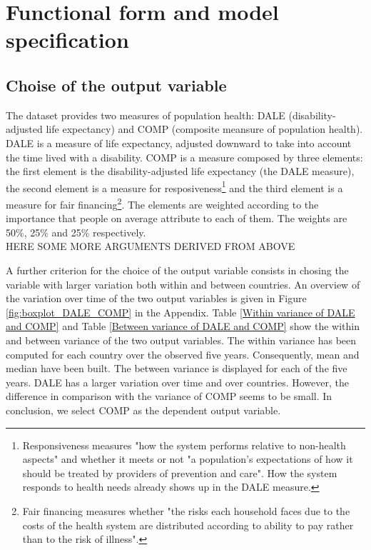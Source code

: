 \documentclass[12pt,a4paper]{article}\usepackage[]{graphicx}\usepackage[]{color}
\begin{document}
\section{Functional form and model specification}
\subsection{Choise of the output variable}
The dataset provides two measures of population health: DALE (disability-adjusted life expectancy) and COMP (composite meansure of population health). DALE is a measure of life expectancy, adjusted downward to take into account the time lived with a disability. COMP is a measure composed by three elements: the first element is the disability-adjusted life expectancy (the DALE measure), the second element is a measure for resposiveness\footnote{Responsiveness measures "how the system performs relative to non-health aspects" and whether it meets or not "a population's expectations of how it should be treated by providers of prevention and care". How the system responds to health needs already shows up in the DALE measure.} and the third element is a measure for fair financing\footnote{Fair financing measures whether "the risks each household faces due to the costs of the health system are distributed according to ability to pay rather than to the risk of illness".}. The elements are weighted according to the importance that people on average attribute to each of them. The weights are 50\%, 25\% and 25\% respectively. \\


HERE SOME MORE ARGUMENTS DERIVED FROM ABOVE


A further criterion for the choice of the output variable consists in chosing the variable with larger variation both within and between countries. An overview of the variation over time of the two output variables is given in Figure \ref{fig:boxplot_DALE_COMP} in the Appendix. Table \ref{Within variance of DALE and COMP} and Table \ref{Between variance of DALE and COMP} show the within and between variance of the two output variables. The within variance has been computed for each country over the observed five years. Consequently, mean and median have been built. The between variance is displayed for each of the five years. DALE has a larger variation over time and over countries. However, the difference in comparison with the variance of COMP seems to be small. In conclusion, we select COMP as the dependent output variable.
\end{document}
